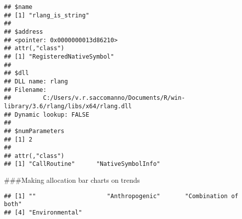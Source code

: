 \documentclass[
]{article}
\newenvironment{Shaded}{\begin{snugshade}}{\end{snugshade}}
\newcommand{\CommentTok}[1]{\textcolor[rgb]{0.56,0.35,0.01}{\textit{#1}}}
\newcommand{\KeywordTok}[1]{\textcolor[rgb]{0.13,0.29,0.53}{\textbf{#1}}}
\newcommand{\NormalTok}[1]{#1}
\newcommand{\OperatorTok}[1]{\textcolor[rgb]{0.81,0.36,0.00}{\textbf{#1}}}
\newcommand{\StringTok}[1]{\textcolor[rgb]{0.31,0.60,0.02}{#1}}
\begin{document}
\begin{verbatim}
## $name
## [1] "rlang_is_string"
## 
## $address
## <pointer: 0x0000000013d86210>
## attr(,"class")
## [1] "RegisteredNativeSymbol"
## 
## $dll
## DLL name: rlang
## Filename:
##         C:/Users/v.r.saccomanno/Documents/R/win-library/3.6/rlang/libs/x64/rlang.dll
## Dynamic lookup: FALSE
## 
## $numParameters
## [1] 2
## 
## attr(,"class")
## [1] "CallRoutine"      "NativeSymbolInfo"
\end{verbatim}

\#\#\#Making allocation bar charts on trends

\begin{Shaded}
\end{Shaded}

\begin{verbatim}
## [1] ""                    "Anthropogenic"       "Combination of both"
## [4] "Environmental"
\end{verbatim}
\end{document}
